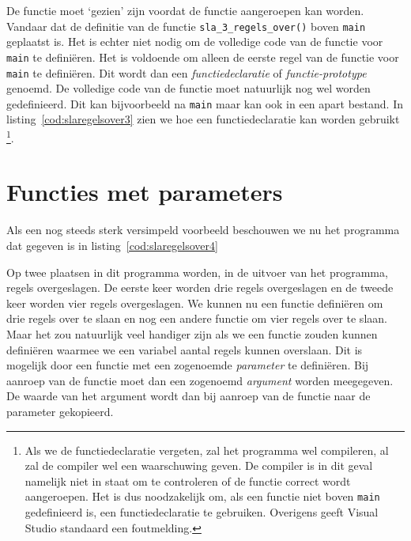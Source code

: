 De functie moet `gezien' zijn voordat de functie aangeroepen kan worden.
Vandaar dat de definitie van de functie \texttt{sla\_3\_regels\_over()} boven \texttt{main} geplaatst is.
Het is echter niet nodig om de volledige code van de functie voor \texttt{main} te definiëren.
Het is voldoende om alleen de eerste regel van de functie voor \texttt{main} te definiëren.
Dit wordt dan een \textsl{functiedeclaratie} of \textsl{functie-prototype} genoemd.
De volledige code van de functie moet natuurlijk nog wel worden gedefinieerd.
Dit kan bijvoorbeeld na \texttt{main} maar kan ook in een apart bestand.
In listing~\ref{cod:slaregelsover3} zien we hoe een functiedeclaratie kan worden gebruikt
\footnote{Als we de functiedeclaratie vergeten, zal het programma wel compileren, al zal de compiler wel een waarschuwing geven. De compiler is in dit geval namelijk niet in staat om te controleren of de functie correct wordt aangeroepen.  Het is dus noodzakelijk om, als een functie niet boven \texttt{main} gedefinieerd is, een functiedeclaratie te gebruiken. Overigens geeft Visual Studio standaard een foutmelding.}.



\section{Functies met parameters} 
Als een nog steeds sterk versimpeld voorbeeld beschouwen we nu het programma dat gegeven is in listing~\ref{cod:slaregelsover4}


Op twee plaatsen in dit programma worden, in de uitvoer van het programma, regels overgeslagen.
De eerste keer worden drie regels overgeslagen en de tweede keer worden vier regels overgeslagen.
We kunnen nu een functie definiëren om drie regels over te slaan en nog een andere functie om vier regels over te slaan.
Maar het zou natuurlijk veel handiger zijn als we een functie zouden kunnen definiëren waarmee we een variabel aantal regels kunnen overslaan.
Dit is mogelijk door een functie met een zogenoemde \textsl{parameter} te definiëren.
Bij aanroep van de functie moet dan een zogenoemd \textsl{argument} worden meegegeven.
De waarde van het argument wordt dan bij aanroep van de functie naar de parameter gekopieerd.

